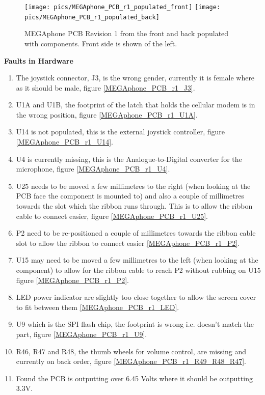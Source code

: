\begin{figure} \begin{center}
\texttt{[image: pics/MEGAphone\_PCB\_r1\_populated\_front]} 
\texttt{[image: pics/MEGAphone\_PCB\_r1\_populated\_back]} 
\end{center} 
\caption{MEGAphone PCB Revision 1 from the front and back populated with components. Front side is shown of the left.\\}
\label{MEGAphone_PCB_r1_populated}
\end{figure}


\textbf{Faults in Hardware}
\begin{enumerate}
\item The joystick connector, J3, is the wrong gender, currently it is female where as it should be male, figure \ref{MEGAphone_PCB_r1_J3}.
\item U1A and U1B, the footprint of the latch that holds the cellular modem is in the wrong position, figure \ref{MEGAphone_PCB_r1_U1A}.
\item U14 is not populated, this is the external joystick controller, figure \ref{MEGAphone_PCB_r1_U14}. 
\item U4 is currently missing, this is the Analogue-to-Digital converter for the microphone, figure \ref{MEGAphone_PCB_r1_U4}.
\item U25 needs to be moved a few millimetres to the right (when looking at the PCB face the component is mounted to) and also a couple of millimetres towards the slot which the ribbon runs through. This is to allow the ribbon cable to connect easier, figure \ref{MEGAphone_PCB_r1_U25}.
\item P2 need to be re-positioned a couple of millimetres towards the ribbon cable slot to allow the ribbon to connect easier \ref{MEGAphone_PCB_r1_P2}.
\item U15 may need to be moved a few millimetres to the left (when looking at the component) to allow for the ribbon cable to reach P2 without rubbing on U15 figure \ref{MEGAphone_PCB_r1_P2}.
\item LED power indicator are slightly too close together to allow the screen cover to fit between them \ref{MEGAphone_PCB_r1_LED}.
\item U9 which is the SPI flash chip, the footprint is wrong i.e. doesn't match the part, figure \ref{MEGAphone_PCB_r1_U9}.
\item R46, R47 and R48, the thumb wheels for volume control, are missing and currently on back order, figure \ref{MEGAphone_PCB_r1_R49_R48_R47}.
\item Found the PCB is outputting over 6.45 Volts where it should be outputting 3.3V. \\
\end{enumerate}


